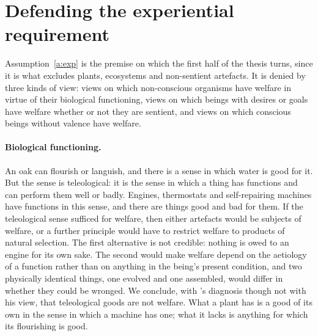 \documentclass{situationist-preprint}
\begin{document}
\section{Defending the experiential requirement}\label{s:requirement}

Assumption~\ref{a:exp} is the premise on which the first half of the thesis turns, since it is what excludes plants, ecosystems and non-sentient artefacts. It is denied by three kinds of view: views on which non-conscious organisms have welfare in virtue of their biological functioning, views on which beings with desires or goals have welfare whether or not they are sentient, and views on which conscious beings without valence have welfare.

\paragraph{Biological functioning.} An oak can flourish or languish, and there is a sense in which water is good for it. But the sense is teleological: it is the sense in which a thing has functions and can perform them well or badly. Engines, thermostats and self-repairing machines have functions in this sense, and there are things good and bad for them. If the teleological sense sufficed for welfare, then either artefacts would be subjects of welfare, or a further principle would have to restrict welfare to products of natural selection. The first alternative is not credible: nothing is owed to an engine for its own sake. The second would make welfare depend on the aetiology of a function rather than on anything in the being's present condition, and two physically identical things, one evolved and one assembled, would differ in whether they could be wronged. We conclude, with \citet{Basl2019}'s diagnosis though not with his view, that teleological goods are not welfare. What a plant has is a good of its own in the sense in which a machine has one; what it lacks is anything for which its flourishing is good.
\end{document}
